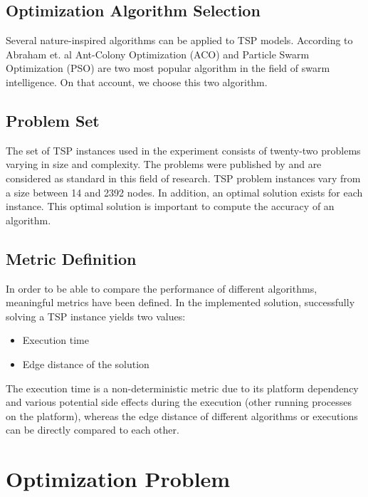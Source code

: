 \documentclass[conference]{IEEEtran}
\begin{document}
	\subsection{Optimization Algorithm Selection}\label{algos}
	Several nature-inspired algorithms can be applied to TSP models. According to Abraham et. al \cite{abraham2007swarm} Ant-Colony Optimization (ACO) and Particle Swarm Optimization (PSO) are two most popular algorithm in the field of swarm intelligence. On that account, we choose this two algorithm. 

	\subsection{Problem Set}\label{problem_set}
	The set of TSP instances used in the experiment consists of twenty-two problems varying in size and complexity. The problems were published by \cite{tsplib2019} and are considered as standard in this field of research. TSP problem instances vary from a size between 14 and 2392 nodes. In addition, an optimal solution exists for each instance. This optimal solution is important to compute the accuracy of an algorithm.
	
	\subsection{Metric Definition}\label{metric}
	In order to be able to compare the performance of different algorithms, meaningful metrics have been defined. In the implemented solution, successfully solving a TSP instance yields two values:
	\begin{itemize}
		\item Execution time
		\item Edge distance of the solution
	\end{itemize}
	The execution time is a non-deterministic metric due to its platform dependency and various potential side effects during the execution (other running processes on the platform), whereas the edge distance of different algorithms or executions can be directly compared to each other.
	
	\section{Optimization Problem}
\end{document}
